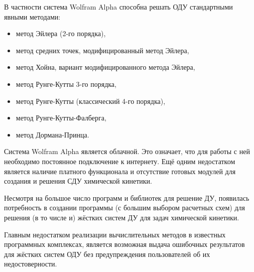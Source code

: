 В частности система Wolfram Alpha способна решать ОДУ стандартными явными методами:
\begin{itemize}
    \item метод Эйлера (2-го порядка),
    \item метод средних точек, модифицированный метод Эйлера,
    \item метод Хойна, вариант модифицированного метода Эйлера,
    \item метод Рунге-Кутты 3-го порядка,
    \item метод Рунге-Кутты (классический 4-го порядка),
    \item метод Рунге-Кутты-Фалберга,
    \item метод Дормана-Принца.
\end{itemize}

Система Wolfram Alpha является облачной. Это означает, что для работы с ней необходимо постоянное подключение к интернету. Ещё
одним недостатком является наличие платного функционала и отсутствие готовых модулей для создания и решения СДУ химической кинетики.

Несмотря на большое число программ и библиотек для решение ДУ, появилась потребность в создании программы (с большим выбором расчетных
схем) для решения (в то числе и) жёстких систем ДУ для задач химической кинетики.

Главным недостатком реализации вычислительных методов в известных программных комплексах, является возможная выдача ошибочных результатов
для жёстких систем ОДУ без предупреждения пользователей об их недостоверности.